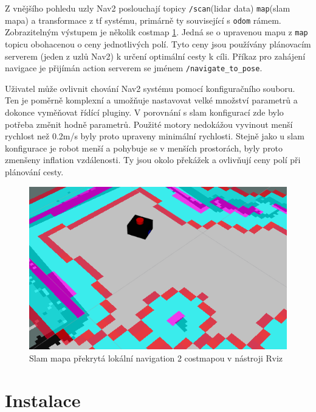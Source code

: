 Z vnějšího pohledu uzly Nav2 poslouchají topicy \verb|/scan|(lidar data) \verb|map|(slam mapa) a transformace z tf systému, primárně ty související s \verb|odom| rámem. Zobrazitelným výstupem je několik costmap \ref{fig:rviz_costmap}. Jedná se o upravenou mapu z \verb|map| topicu obohacenou o ceny jednotlivých polí. Tyto ceny jsou používány plánovacím serverem (jeden z uzlů Nav2) k určení optimální cesty k cíli. Příkaz pro zahájení navigace je přijímán action serverem se jménem \verb|/navigate_to_pose|. 

Uživatel může ovlivnit chování Nav2 systému pomocí konfiguračního souboru. Ten je poměrně komplexní a umožňuje nastavovat velké množství parametrů a dokonce vyměňovat řídící pluginy. V porovnání s slam konfigurací zde bylo potřeba změnit hodně parametrů. Použité motory nedokážou vyvinout menší rychlost než 0.2m/s byly proto upraveny minimální rychlosti. Stejně jako u slam konfigurace je robot menší a pohybuje se v menších prostorách, byly proto zmenšeny inflation vzdálenosti. Ty jsou okolo překážek a ovlivňují ceny polí při plánování cesty.


\begin{figure}[h!]
	\centering
	\includegraphics[scale=0.7]{obrazky-figures/nav2.png}
	\caption{Slam mapa překrytá lokální navigation 2 costmapou v nástroji Rviz}
	\label{fig:rviz_costmap}
\end{figure}

\newpage %
\section*{Instalace}

